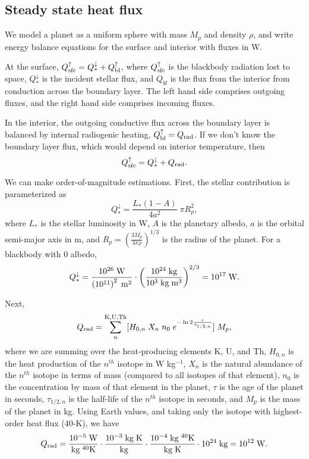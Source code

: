 \documentclass[10pt,a4paper]{article}
\begin{document}
\subsection{Steady state heat flux}

We model a planet as a uniform sphere with mass $M_p$ and density $\rho$, and write energy balance equations for the surface and interior with fluxes in W. 

At the surface, $Q_{\rm sfc}^{\uparrow} = Q_*^{\downarrow} + Q^{\uparrow}_{\rm bl}$, where $Q_{\rm sfc}^{\uparrow}$ is the blackbody radiation lost to space, $Q_*^{\downarrow}$ is the incident stellar flux, and $Q_{bl}$ is the flux from the interior from conduction across the boundary layer. The left hand side comprises outgoing fluxes, and the right hand side comprises incoming fluxes. 

In the interior, the outgoing conductive flux across the boundary layer is balanced by internal radiogenic heating, $Q^{\uparrow}_{\rm bl} = Q_{\rm rad}$. If we don't know the boundary layer flux, which would depend on interior temperature, then
\begin{equation}
Q_{\rm sfc}^{\uparrow} = Q_*^{\downarrow} + Q_{\rm rad}.
\end{equation}

We can make order-of-magnitude estimations. First, the stellar contribution is parameterized as
\begin{equation}
Q_*^{\downarrow} = \frac{L_*(1-A)}{4a^2} \; \pi R_p^2,
\end{equation}
where $L_*$ is the stellar luminosity in W, $A$ is the planetary albedo, $a$ is the orbital semi-major axis in m, and $R_p = \left(\frac{3M_p}{4 \pi \rho}\right)^{1/3}$ is the radius of the planet. For a blackbody with 0 albedo, 
\begin{equation}
Q_*^{\downarrow} = \frac{10^{26} \; {\rm W}}{\left(10^{11}\right)^2 \; \rm{m}^2} \cdot \left(\frac{10^{24}\;{\rm kg}}{10^3 \; {\rm kg}\;{\rm m}^3}\right)^{2/3} = 10^{17} \; {\rm W}.
\end{equation}


Next,
\begin{equation}
Q_{\rm rad} = \sum^{\rm K, U, Th}_n [ H_{0, n} \; X_n \; n_0 \; e^{-\ln 2 \frac{\tau}{\tau_{1/2 ,n}}} ] \; M_p,
\end{equation}
where we are summing over the heat-producing elements K, U, and Th, $H_{0, n}$ is the heat production of the $n^{th}$ isotope in W kg$^{-1}$, $X_n$ is the natural abundance of the $n^{th}$ isotope in terms of mass (compared to all isotopes of that element), $n_0$ is the concentration by mass of that element in the planet, $\tau$ is the age of the planet in seconds,  $\tau_{1/2 ,n}$ is the half-life of the $n^{th}$ isotope in seconds, and $M_p$ is the mass of the planet in kg. Using Earth values, and taking only the isotope with highest-order heat flux (40-K), we have
\begin{equation}
Q_{\rm rad} = \frac{10^{-5}\;{\rm W}}{{\rm kg}\;^{40}{\rm K}} \cdot \frac{10^{-3}\;\rm{kg\;K}}{\rm kg} \cdot \frac{10^{-4}\;{\rm kg}\;^{40}{\rm K}}{\rm{kg\;K}} \cdot 10^{24} \; {\rm kg} = 10^{12} \; {\rm W}.
\end{equation}
\end{document}
